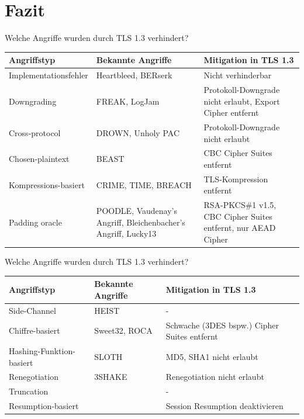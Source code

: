 \documentclass{f4_beamer_metropolis}
\begin{document}
\section{Fazit}

\begin{frame}{Welche Angriffe wurden durch TLS 1.3 verhindert?}

  \begin{tabularx}{\textwidth}{
    |>{\hsize} Y |
    >{\hsize} Y |
    >{\hsize} Y |
  }
  \hline
  \textbf{Angriffstyp} & \textbf{Bekannte Angriffe} & \textbf{Mitigation in TLS 1.3}\\ \hline
  Implementationsfehler & Heartbleed, BERserk & Nicht verhinderbar \\ \hline
  Downgrading & FREAK, LogJam & Protokoll-Downgrade nicht erlaubt, Export Cipher entfernt \\ \hline
  Cross-protocol & DROWN, Unholy PAC & Protokoll-Downgrade nicht erlaubt \\ \hline
  Chosen-plaintext & BEAST & CBC Cipher Suites entfernt \\ \hline
  Kompressions-basiert & CRIME, TIME, BREACH & TLS-Kompression entfernt \\ \hline
  Padding oracle & POODLE, Vaudenay's Angriff, Bleichenbacher's Angriff, Lucky13 & RSA-PKCS\#1 v1.5, CBC Cipher Suites entfernt, nur AEAD Cipher \\ \hline
  \end{tabularx}


  \note{
  }
\end{frame}

\begin{frame}{Welche Angriffe wurden durch TLS 1.3 verhindert?}
  \begin{tabularx}{\textwidth}{
    |>{\hsize} Y |
    >{\hsize} Y |
    >{\hsize} Y |
  }
  \hline
  \textbf{Angriffstyp} & \textbf{Bekannte Angriffe} & \textbf{Mitigation in TLS 1.3}\\ \hline
  Side-Channel & HEIST & - \\ \hline
  Chiffre-basiert & Sweet32, ROCA & Schwache (3DES bspw.) Cipher Suites entfernt \\ \hline
  Hashing-Funktion-basiert & SLOTH & MD5, SHA1 nicht erlaubt \\ \hline
  Renegotiation & 3SHAKE & Renegotiation nicht erlaubt \\ \hline
  Truncation & \autocite{TruncatingTLS} & - \\ \hline
  Resumption-basiert & \autocite{TrackingUsers} & Session Resumption deaktivieren \\ \hline
  \end{tabularx}

  \note{
  }
\end{frame}
\end{document}
